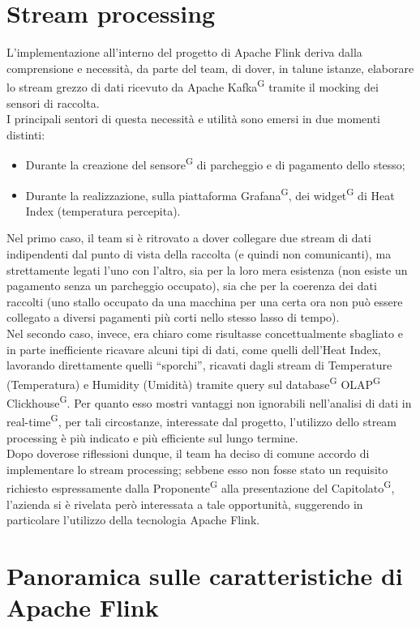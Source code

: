 \documentclass[8pt]{article}
\newcommand{\glossterm}[1]{#1\textsuperscript{G}} %
\begin{document}
\section{Stream processing}
L'implementazione all'interno del progetto di Apache Flink deriva dalla comprensione e necessità, da parte del team, di dover, in talune istanze, elaborare lo stream grezzo di dati ricevuto da Apache \glossterm{Kafka} tramite il mocking dei sensori di raccolta.\\
I principali sentori di questa necessità e utilità sono emersi in due momenti distinti:
\begin{itemize}
\setlength\itemsep{0em}
    \item Durante la creazione del \glossterm{sensore} di parcheggio e di pagamento dello stesso;
    \item Durante la realizzazione, sulla piattaforma \glossterm{Grafana}, dei \glossterm{widget} di Heat Index (temperatura percepita).
\end{itemize}
Nel primo caso, il team si è ritrovato a dover collegare due stream di dati indipendenti dal punto di vista della raccolta (e quindi non comunicanti), ma strettamente legati l'uno con l'altro, sia per la loro mera esistenza (non esiste un pagamento senza un parcheggio occupato), sia che per la coerenza dei dati raccolti (uno stallo occupato da una macchina per una certa ora non può essere collegato a diversi pagamenti più corti nello stesso lasso di tempo).\\
Nel secondo caso, invece, era chiaro come risultasse concettualmente sbagliato e in parte inefficiente ricavare alcuni tipi di dati, come quelli dell'Heat Index, lavorando direttamente quelli ``sporchi'', ricavati dagli stream di Temperature (Temperatura) e Humidity (Umidità) tramite query sul \glossterm{database} \glossterm{OLAP} \glossterm{Clickhouse}. Per quanto esso mostri vantaggi non ignorabili nell'analisi di dati in \glossterm{real-time}, per tali circostanze, interessate dal progetto, l'utilizzo dello stream processing è più indicato e più efficiente sul lungo termine.\\
Dopo doverose riflessioni dunque, il team ha deciso di comune accordo di implementare lo stream processing; sebbene esso non fosse stato un requisito richiesto espressamente dalla \glossterm{Proponente} alla presentazione del \glossterm{Capitolato}, l'azienda si è rivelata però interessata a tale opportunità, suggerendo in particolare l'utilizzo della tecnologia Apache Flink.

\section{Panoramica sulle caratteristiche di Apache Flink}
\end{document}
